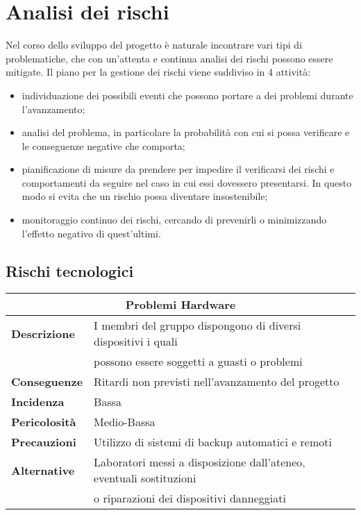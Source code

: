 \chapter{Analisi dei rischi}
Nel corso dello sviluppo del progetto è naturale incontrare vari tipi di problematiche, che con un'attenta e continua analisi dei rischi possono essere mitigate. Il piano per la gestione dei rischi viene suddiviso in 4 attività:
\begin{itemize}
    \item individuazione dei possibili eventi che possono portare a dei problemi durante l'avanzamento;
    \item analisi del problema, in particolare la probabilità con cui si possa verificare e le conseguenze
    negative che comporta;
    \item pianificazione di misure da prendere per impedire il verificarsi dei rischi e comportamenti da seguire nel caso in cui essi dovessero presentarsi. In questo modo si evita che un rischio possa diventare insostenibile;
    \item monitoraggio continuo dei rischi, cercando di prevenirli o minimizzando l'effetto negativo di quest'ultimi.
\end{itemize}

\section{Rischi tecnologici}

\begin{center}
    \begin{tabularx}{0.8\linewidth}{l|l}
        \multicolumn{2}{c}{\textbf{Problemi Hardware}}                                                          \\
        \hline{\textbf{Descrizione}}    & I membri del gruppo dispongono di diversi dispositivi i quali         \\ 
                                        & possono essere soggetti a guasti o problemi                           \\
        \textbf{Conseguenze}            & Ritardi non previsti nell'avanzamento del progetto                    \\
        \textbf{Incidenza}              & Bassa                                                                 \\
        \textbf{Pericolosità}           & Medio-Bassa                                                           \\
        \textbf{Precauzioni}            & Utilizzo di sistemi di backup automatici e remoti                     \\
        \textbf{Alternative}            & Laboratori messi a disposizione dall'ateneo, eventuali sostituzioni   \\ 
                                        & o riparazioni dei dispositivi danneggiati                             \\     
    \end{tabularx}
\end{center}

